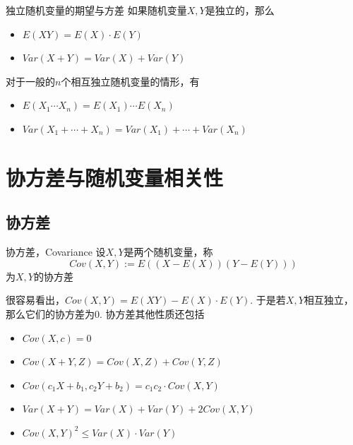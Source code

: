 
\begin{frame}

\begin{block}{独立随机变量的期望与方差}
如果随机变量$X,Y$是独立的，那么
\begin{itemize}
\item $E(XY) = E(X)\cdot E(Y)$
\item $Var(X+Y) = Var(X) + Var(Y)$
\end{itemize}

\vspace{2em}
\pause

对于一般的$n$个相互独立随机变量的情形，有
\begin{itemize}
\item $E(X_1\cdots X_n) = E(X_1)\cdots E(X_n)$
\item $Var(X_1 + \cdots + X_n) = Var(X_1) + \cdots + Var(X_n)$
\end{itemize}
\end{block}

\end{frame}


\section{协方差与随机变量相关性}


\subsection{协方差}


\begin{frame}

\begin{block}{协方差，Covariance}
设$X,Y$是两个随机变量，称
$$Cov(X,Y) := E((X-E(X))(Y-E(Y)))$$
为$X,Y$的协方差
\end{block}

\vspace{1em}
\pause

很容易看出，$Cov(X,Y) = E(XY) - E(X)\cdot E(Y)$. 于是若$X,Y$相互独立，那么它们的协方差为0. 协方差其他性质还包括
\begin{itemize}
\item $Cov(X,c) = 0$
\item $Cov(X+Y,Z) = Cov(X,Z) + Cov(Y,Z)$
\item $Cov(c_1X+b_1, c_2Y+b_2) = c_1c_2\cdot Cov(X,Y)$ \pause
\item $Var(X+Y) = Var(X) + Var(Y) + 2Cov(X,Y)$
\item $Cov(X,Y)^2 \le Var(X)\cdot Var(Y)$
\end{itemize}

\end{frame}

